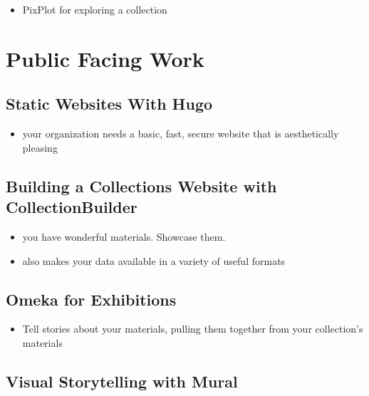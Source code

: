 \documentclass[
]{book}
\providecommand{\tightlist}{%
  \setlength{\itemsep}{0pt}\setlength{\parskip}{0pt}}
\begin{document}
\begin{itemize}
\tightlist
\item
  PixPlot for exploring a collection
\end{itemize}

\hypertarget{public-facing-work}{%
\chapter{Public Facing Work}\label{public-facing-work}}

\hypertarget{hugo}{%
\section{Static Websites With Hugo}\label{hugo}}

\begin{itemize}
\tightlist
\item
  your organization needs a basic, fast, secure website that is aesthetically pleasing
\end{itemize}

\hypertarget{collectionbuilder}{%
\section{Building a Collections Website with CollectionBuilder}\label{collectionbuilder}}

\begin{itemize}
\tightlist
\item
  you have wonderful materials. Showcase them.
\item
  also makes your data available in a variety of useful formats
\end{itemize}

\hypertarget{omeka}{%
\section{Omeka for Exhibitions}\label{omeka}}

\begin{itemize}
\tightlist
\item
  Tell stories about your materials, pulling them together from your collection's materials
\end{itemize}

\hypertarget{mural}{%
\section{Visual Storytelling with Mural}\label{mural}}
\end{document}
